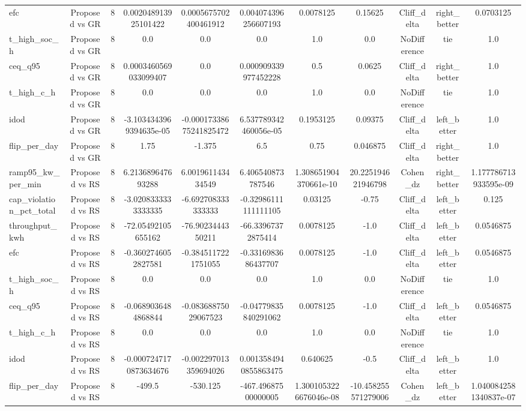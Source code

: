 \begin{table}[t]
\begin{tabular}{lcccccccccc}
efc & Proposed vs GR & 8 & 0.002048913925101422 & 0.0005675702400461912 & 0.004074396256607193 & 0.0078125 & 0.15625 & Cliff\_delta & right\_better & 0.0703125 \\
t\_high\_soc\_h & Proposed vs GR & 8 & 0.0 & 0.0 & 0.0 & 1.0 & 0.0 & NoDifference & tie & 1.0 \\
ceq\_q95 & Proposed vs GR & 8 & 0.0003460569033099407 & 0.0 & 0.000909339977452228 & 0.5 & 0.0625 & Cliff\_delta & right\_better & 1.0 \\
t\_high\_c\_h & Proposed vs GR & 8 & 0.0 & 0.0 & 0.0 & 1.0 & 0.0 & NoDifference & tie & 1.0 \\
idod & Proposed vs GR & 8 & -3.1034343969394635e-05 & -0.00017338675241825472 & 6.537789342460056e-05 & 0.1953125 & 0.09375 & Cliff\_delta & left\_better & 1.0 \\
flip\_per\_day & Proposed vs GR & 8 & 1.75 & -1.375 & 6.5 & 0.75 & 0.046875 & Cliff\_delta & right\_better & 1.0 \\
ramp95\_kw\_per\_min & Proposed vs RS & 8 & 6.213689647693288 & 6.001961143434549 & 6.406540873787546 & 1.308651904370661e-10 & 20.225194621946798 & Cohen\_dz & right\_better & 1.177786713933595e-09 \\
cap\_violation\_pct\_total & Proposed vs RS & 8 & -3.0208333333333335 & -6.692708333333333 & -0.32986111111111105 & 0.03125 & -0.75 & Cliff\_delta & left\_better & 0.125 \\
throughput\_kwh & Proposed vs RS & 8 & -72.05492105655162 & -76.9023444350211 & -66.33967372875414 & 0.0078125 & -1.0 & Cliff\_delta & left\_better & 0.0546875 \\
efc & Proposed vs RS & 8 & -0.3602746052827581 & -0.3845117221751055 & -0.3316983686437707 & 0.0078125 & -1.0 & Cliff\_delta & left\_better & 0.0546875 \\
t\_high\_soc\_h & Proposed vs RS & 8 & 0.0 & 0.0 & 0.0 & 1.0 & 0.0 & NoDifference & tie & 1.0 \\
ceq\_q95 & Proposed vs RS & 8 & -0.0689036484868844 & -0.08368875029067523 & -0.04779835840291062 & 0.0078125 & -1.0 & Cliff\_delta & left\_better & 0.0546875 \\
t\_high\_c\_h & Proposed vs RS & 8 & 0.0 & 0.0 & 0.0 & 1.0 & 0.0 & NoDifference & tie & 1.0 \\
idod & Proposed vs RS & 8 & -0.0007247170873634676 & -0.002297013359694026 & 0.0013584940855863475 & 0.640625 & -0.5 & Cliff\_delta & left\_better & 1.0 \\
flip\_per\_day & Proposed vs RS & 8 & -499.5 & -530.125 & -467.49687500000005 & 1.3001053226676046e-08 & -10.458255571279006 & Cohen\_dz & left\_better & 1.0400842581340837e-07 \\

\end{tabular}
\end{table}
